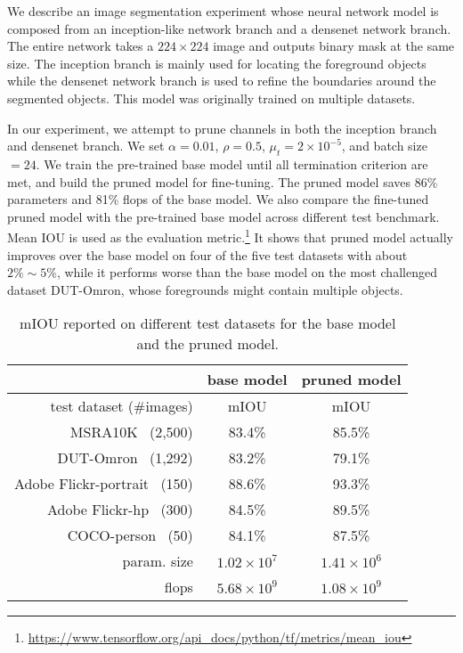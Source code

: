 \documentclass{article} %
\begin{document}
We describe an image segmentation experiment whose neural network model
is composed from an inception-like network branch and a densenet network branch.
The entire network takes a $224\times 224$ image and outputs binary mask at the same size. 
The inception branch is mainly used for locating the foreground objects while the densenet
network branch is used to refine the boundaries around the segmented objects. 
This model was originally trained on multiple datasets. 

In our experiment, we attempt to prune channels in both the inception branch and densenet branch.
We set $\alpha=0.01$, $\rho=0.5$, $\mu_t=2\times 10^{-5}$, and batch size $=24$.
We train the pre-trained base model until all termination criterion are met, 
and build the pruned model for fine-tuning. The pruned model saves 
86\% parameters and 81\% flops of the base model.
We also compare the fine-tuned pruned model with 
the pre-trained base model across different test benchmark. 
Mean IOU is used as the evaluation metric.\footnote{\url{https://www.tensorflow.org/api_docs/python/tf/metrics/mean_iou}}
It shows that pruned model
actually improves over the base model on four of the five test datasets with about $2\% \sim 5\%$,
while it performs worse than the base model on the most challenged dataset DUT-Omron, whose foregrounds 
might contain multiple objects. 

\begin{table}[htp]\centering
\begin{tabular}{rcc}
& base model & pruned model \\\hline
test dataset (\#images) & mIOU & mIOU\\
MSRA10K~\citep{liu2011learning} (2,500) & 83.4\% & 85.5\% \\
DUT-Omron~\citep{yang2013saliency} (1,292) & 83.2\% & 79.1\% \\
Adobe Flickr-portrait~\citep{shen2016automatic} (150) & 88.6\% & 93.3\% \\
Adobe Flickr-hp~\citep{shen2016automatic} (300) & 84.5\% & 89.5\%\\
COCO-person~\citep{lin2014microsoft} (50) & 84.1\% & 87.5\%\\
\hline
param. size & $1.02 \times 10^7$ & $1.41 \times 10^6$ \\
flops & $5.68 \times 10^9$ & $1.08 \times 10^9$
\end{tabular}
\caption{mIOU reported on different test datasets for the base model and the pruned model.}
\end{table}
\end{document}
